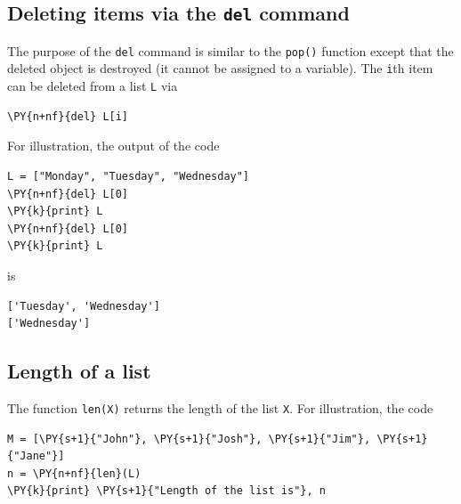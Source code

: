 \subsection[\ \ Deleting items via the {\tt del} command]{Deleting items via the {\tt del} command}

\noindent
The purpose of the {\tt del} command is similar to the {\tt pop()} function
except that the deleted object is destroyed (it cannot be assigned to a variable).
The {\tt i}th item can be deleted from a list {\tt L} via \\

\begin{bbox}
\begin{Verbatim}[commandchars=\\\{\}]
\PY{n+nf}{del} L[i]
\end{Verbatim}
\end{bbox}
\vspace{6mm}

\noindent
For illustration, the output of the code \\

\begin{bbox}
\begin{Verbatim}[commandchars=\\\{\}]
L = ["Monday", "Tuesday", "Wednesday"]
\PY{n+nf}{del} L[0]
\PY{k}{print} L
\PY{n+nf}{del} L[0]
\PY{k}{print} L
\end{Verbatim}
\end{bbox}
\vspace{6mm}

\noindent
is \\

\begin{ybox}
\begin{Verbatim}[commandchars=\\\{\}]
['Tuesday', 'Wednesday']
['Wednesday']
\end{Verbatim}
\end{ybox}
\vspace{6mm}

\subsection[\ \ Length of a list]{Length of a list}

\noindent
The function {\tt len(X)} returns the length of the list {\tt X}.
For illustration, the code \\

\begin{bbox}
\begin{Verbatim}[commandchars=\\\{\}]
M = [\PY{s+1}{"John"}, \PY{s+1}{"Josh"}, \PY{s+1}{"Jim"}, \PY{s+1}{"Jane"}]
n = \PY{n+nf}{len}(L)
\PY{k}{print} \PY{s+1}{"Length of the list is"}, n
\end{Verbatim}
\end{bbox}
\vspace{6mm}

